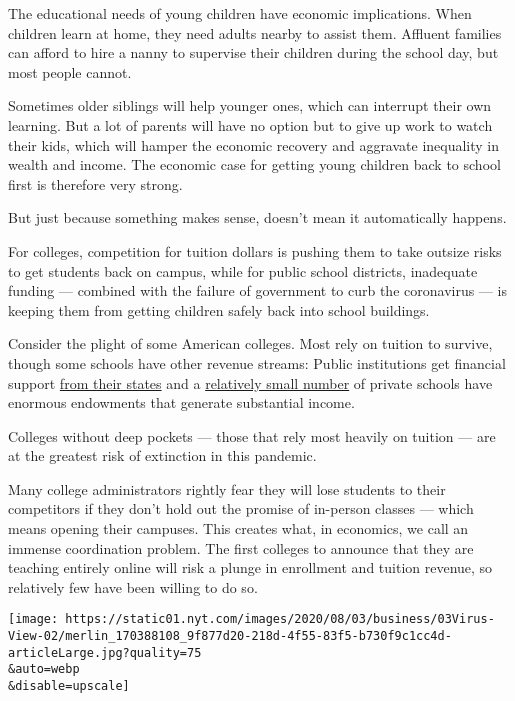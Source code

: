 The educational needs of young children have economic implications. When
children learn at home, they need adults nearby to assist them. Affluent
families can afford to hire a nanny to supervise their children during
the school day, but most people cannot.

Sometimes older siblings will help younger ones, which can interrupt
their own learning. But a lot of parents will have no option but to give
up work to watch their kids, which will hamper the economic recovery and
aggravate inequality in wealth and income. The economic case for getting
young children back to school first is therefore very strong.

But just because something makes sense, doesn't mean it automatically
happens.

For colleges, competition for tuition dollars is pushing them to take
outsize risks to get students back on campus, while for public school
districts, inadequate funding --- combined with the failure of
government to curb the coronavirus --- is keeping them from getting
children safely back into school buildings.

Consider the plight of some American colleges. Most rely on tuition to
survive, though some schools have other revenue streams: Public
institutions get financial support
\href{https://research.collegeboard.org/trends/college-pricing/figures-tables/total-and-student-state-and-local-funding-and-public-enrollment-over-time}{from
their states} and a
\href{https://research.collegeboard.org/pdf/2019-trendsincp-fig-19.pdf}{relatively
small number} of private schools have enormous endowments that generate
substantial income.

Colleges without deep pockets --- those that rely most heavily on
tuition --- are at the greatest risk of extinction in this pandemic.

Many college administrators rightly fear they will lose students to
their competitors if they don't hold out the promise of in-person
classes --- which means opening their campuses. This creates what, in
economics, we call an immense coordination problem. The first colleges
to announce that they are teaching entirely online will risk a plunge in
enrollment and tuition revenue, so relatively few have been willing to
do so.

\texttt{[image: https://static01.nyt.com/images/2020/08/03/business/03Virus-View-02/merlin\_170388108\_9f877d20-218d-4f55-83f5-b730f9c1cc4d-articleLarge.jpg?quality=75\\\&auto=webp\\\&disable=upscale]}

